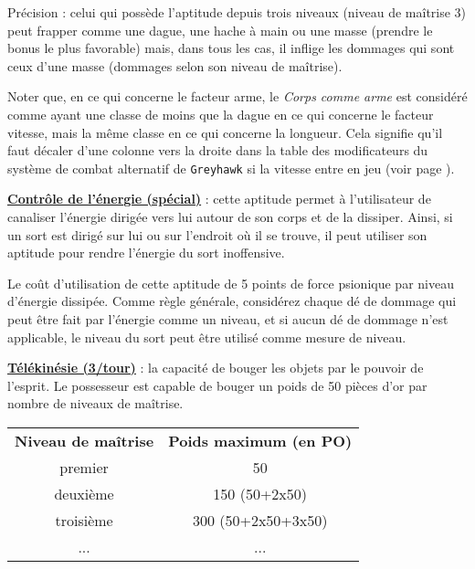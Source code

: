 \bigskip

Précision : celui qui possède l'aptitude depuis trois niveaux (niveau de maîtrise 3) peut frapper comme une dague, une hache à main ou une masse (prendre le bonus le plus favorable) mais, dans tous les cas, il inflige les dommages qui sont ceux d'une masse (dommages selon son niveau de maîtrise).

\bigskip

Noter que, en ce qui concerne le facteur arme, le \textit{Corps comme arme} est considéré comme ayant une classe de moins que la dague en ce qui concerne le facteur vitesse, mais la même classe en ce qui concerne la longueur. Cela signifie qu'il faut décaler d'une colonne vers la droite dans la table des modificateurs du système de combat alternatif de \texttt{Greyhawk} si la vitesse entre en jeu (voir page \pageref{custom-combat-alternatif}).

\bigskip

\label{guerrier-controle-energie}\textbf{\uline{Contrôle de l'énergie (spécial)}} : cette aptitude permet à l'utilisateur de canaliser l'énergie dirigée vers lui autour de son corps et de la dissiper. Ainsi, si un sort est dirigé sur lui ou sur l'endroit où il se trouve, il peut utiliser son aptitude pour rendre l'énergie du sort inoffensive.

\bigskip

Le coût d'utilisation de cette aptitude de 5 points de force psionique par niveau d'énergie dissipée. Comme règle générale, considérez chaque dé de dommage qui peut être fait par l'énergie comme un niveau, et si aucun dé de dommage n'est applicable, le niveau du sort peut être utilisé comme mesure de niveau.

\bigskip

\label{guerrier-telekinesie}\textbf{\uline{Télékinésie (3/tour)}} : la capacité de bouger les objets par le pouvoir de l'esprit. Le possesseur est capable de bouger un poids de 50 pièces d'or par nombre de niveaux de maîtrise.

\bigskip

\begin{tabular}{cc}
\textbf{Niveau de maîtrise} & \textbf{Poids maximum (en PO)} \\
premier     & 50 \\
deuxième    & 150 (50+2x50) \\
troisième   & 300 (50+2x50+3x50) \\
...         & ... \\
\end{tabular}

